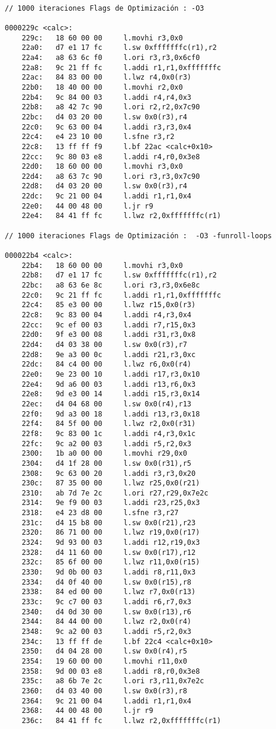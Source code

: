 	\begin{lstlisting}[frame=single]
	
// 1000 iteraciones Flags de Optimización : -O3 

0000229c <calc>:
    229c:	18 60 00 00 	l.movhi r3,0x0
    22a0:	d7 e1 17 fc 	l.sw 0xfffffffc(r1),r2
    22a4:	a8 63 6c f0 	l.ori r3,r3,0x6cf0
    22a8:	9c 21 ff fc 	l.addi r1,r1,0xfffffffc
    22ac:	84 83 00 00 	l.lwz r4,0x0(r3)
    22b0:	18 40 00 00 	l.movhi r2,0x0
    22b4:	9c 84 00 03 	l.addi r4,r4,0x3
    22b8:	a8 42 7c 90 	l.ori r2,r2,0x7c90
    22bc:	d4 03 20 00 	l.sw 0x0(r3),r4
    22c0:	9c 63 00 04 	l.addi r3,r3,0x4
    22c4:	e4 23 10 00 	l.sfne r3,r2
    22c8:	13 ff ff f9 	l.bf 22ac <calc+0x10>
    22cc:	9c 80 03 e8 	l.addi r4,r0,0x3e8
    22d0:	18 60 00 00 	l.movhi r3,0x0
    22d4:	a8 63 7c 90 	l.ori r3,r3,0x7c90
    22d8:	d4 03 20 00 	l.sw 0x0(r3),r4
    22dc:	9c 21 00 04 	l.addi r1,r1,0x4
    22e0:	44 00 48 00 	l.jr r9
    22e4:	84 41 ff fc 	l.lwz r2,0xfffffffc(r1)

// 1000 iteraciones Flags de Optimización :  -O3 -funroll-loops

000022b4 <calc>:
    22b4:	18 60 00 00 	l.movhi r3,0x0
    22b8:	d7 e1 17 fc 	l.sw 0xfffffffc(r1),r2
    22bc:	a8 63 6e 8c 	l.ori r3,r3,0x6e8c
    22c0:	9c 21 ff fc 	l.addi r1,r1,0xfffffffc
    22c4:	85 e3 00 00 	l.lwz r15,0x0(r3)
    22c8:	9c 83 00 04 	l.addi r4,r3,0x4
    22cc:	9c ef 00 03 	l.addi r7,r15,0x3
    22d0:	9f e3 00 08 	l.addi r31,r3,0x8
    22d4:	d4 03 38 00 	l.sw 0x0(r3),r7
    22d8:	9e a3 00 0c 	l.addi r21,r3,0xc
    22dc:	84 c4 00 00 	l.lwz r6,0x0(r4)
    22e0:	9e 23 00 10 	l.addi r17,r3,0x10
    22e4:	9d a6 00 03 	l.addi r13,r6,0x3
    22e8:	9d e3 00 14 	l.addi r15,r3,0x14
    22ec:	d4 04 68 00 	l.sw 0x0(r4),r13
    22f0:	9d a3 00 18 	l.addi r13,r3,0x18
    22f4:	84 5f 00 00 	l.lwz r2,0x0(r31)
    22f8:	9c 83 00 1c 	l.addi r4,r3,0x1c
    22fc:	9c a2 00 03 	l.addi r5,r2,0x3
    2300:	1b a0 00 00 	l.movhi r29,0x0
    2304:	d4 1f 28 00 	l.sw 0x0(r31),r5
    2308:	9c 63 00 20 	l.addi r3,r3,0x20
    230c:	87 35 00 00 	l.lwz r25,0x0(r21)
    2310:	ab 7d 7e 2c 	l.ori r27,r29,0x7e2c
    2314:	9e f9 00 03 	l.addi r23,r25,0x3
    2318:	e4 23 d8 00 	l.sfne r3,r27
    231c:	d4 15 b8 00 	l.sw 0x0(r21),r23
    2320:	86 71 00 00 	l.lwz r19,0x0(r17)
    2324:	9d 93 00 03 	l.addi r12,r19,0x3
    2328:	d4 11 60 00 	l.sw 0x0(r17),r12
    232c:	85 6f 00 00 	l.lwz r11,0x0(r15)
    2330:	9d 0b 00 03 	l.addi r8,r11,0x3
    2334:	d4 0f 40 00 	l.sw 0x0(r15),r8
    2338:	84 ed 00 00 	l.lwz r7,0x0(r13)
    233c:	9c c7 00 03 	l.addi r6,r7,0x3
    2340:	d4 0d 30 00 	l.sw 0x0(r13),r6
    2344:	84 44 00 00 	l.lwz r2,0x0(r4)
    2348:	9c a2 00 03 	l.addi r5,r2,0x3
    234c:	13 ff ff de 	l.bf 22c4 <calc+0x10>
    2350:	d4 04 28 00 	l.sw 0x0(r4),r5
    2354:	19 60 00 00 	l.movhi r11,0x0
    2358:	9d 00 03 e8 	l.addi r8,r0,0x3e8
    235c:	a8 6b 7e 2c 	l.ori r3,r11,0x7e2c
    2360:	d4 03 40 00 	l.sw 0x0(r3),r8
    2364:	9c 21 00 04 	l.addi r1,r1,0x4
    2368:	44 00 48 00 	l.jr r9
    236c:	84 41 ff fc 	l.lwz r2,0xfffffffc(r1)


\end{lstlisting}
